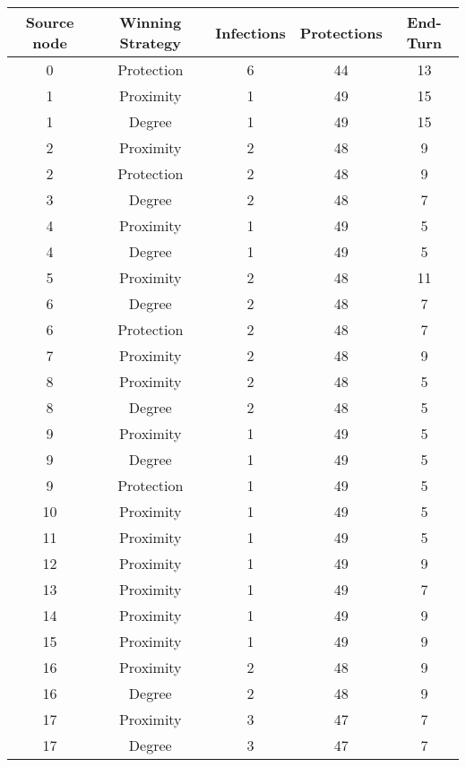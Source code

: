 \documentclass[results.tex]{subfiles}
\begin{document}
\begin{center}
  \begin{tabular}{| c || c | c | c | c |}
    \hline
    {\bfseries Source node} & {\bfseries Winning Strategy} & {\bfseries Infections} & {\bfseries Protections} & {\bfseries End-Turn} \\  %
    \hline\hline
    0 & Protection & 6 & 44 & 13 \\ 
    \hline
    1 & Proximity & 1 & 49 & 15 \\ 
    \hline
    1 & Degree & 1 & 49 & 15 \\ 
    \hline
    2 & Proximity & 2 & 48 & 9 \\ 
    \hline
    2 & Protection & 2 & 48 & 9 \\ 
    \hline
    3 & Degree & 2 & 48 & 7 \\ 
    \hline
    4 & Proximity & 1 & 49 & 5 \\ 
    \hline
    4 & Degree & 1 & 49 & 5 \\ 
    \hline
    5 & Proximity & 2 & 48 & 11 \\ 
    \hline
    6 & Degree & 2 & 48 & 7 \\ 
    \hline
    6 & Protection & 2 & 48 & 7 \\ 
    \hline
    7 & Proximity & 2 & 48 & 9 \\ 
    \hline
    8 & Proximity & 2 & 48 & 5 \\ 
    \hline
    8 & Degree & 2 & 48 & 5 \\ 
    \hline
    9 & Proximity & 1 & 49 & 5 \\ 
    \hline
    9 & Degree & 1 & 49 & 5 \\ 
    \hline
    9 & Protection & 1 & 49 & 5 \\ 
    \hline
    10 & Proximity & 1 & 49 & 5 \\ 
    \hline
    11 & Proximity & 1 & 49 & 5 \\ 
    \hline
    12 & Proximity & 1 & 49 & 9 \\ 
    \hline
    13 & Proximity & 1 & 49 & 7 \\ 
    \hline
    14 & Proximity & 1 & 49 & 9 \\ 
    \hline
    15 & Proximity & 1 & 49 & 9 \\ 
    \hline
    16 & Proximity & 2 & 48 & 9 \\ 
    \hline
    16 & Degree & 2 & 48 & 9 \\ 
    \hline
    17 & Proximity & 3 & 47 & 7 \\ 
    \hline
    17 & Degree & 3 & 47 & 7 \\ 

\end{tabular}
\end{center}
\end{document}
